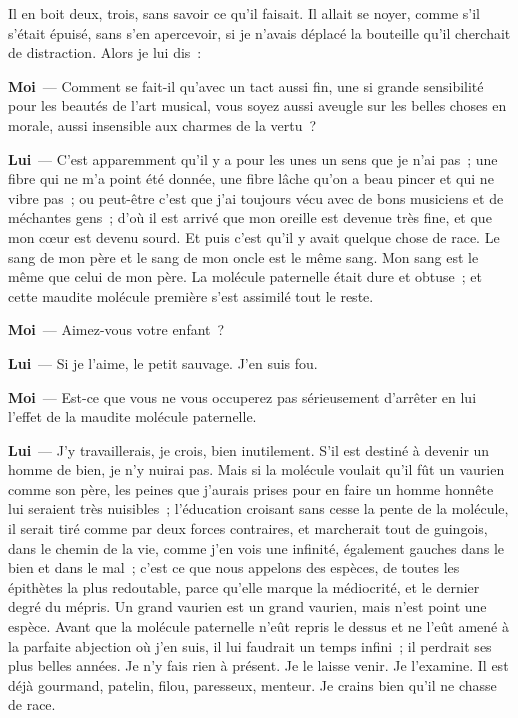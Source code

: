 \documentclass[french,twoside]{book} %
\newcommand{\labelchar}[1]{\textbf{\color{rubric} #1}}
\begin{document}
Il en boit deux, trois, sans savoir ce qu’il faisait. Il allait se noyer, comme s’il s’était épuisé, sans s’en apercevoir, si je n’avais déplacé la bouteille qu’il cherchait de distraction. Alors je lui dis :\par
\labelchar{Moi} — Comment se fait-il qu’avec un tact aussi fin, une si grande sensibilité pour les beautés de l’art musical, vous soyez aussi aveugle sur les belles choses en morale, aussi insensible aux charmes de la vertu ?\par
\labelchar{Lui} — C’est apparemment qu’il y a pour les unes un sens que je n’ai pas ; une fibre qui ne m’a point été donnée, une fibre lâche qu’on a beau pincer et qui ne vibre pas ; ou peut-être c’est que j’ai toujours vécu avec de bons musiciens et de méchantes gens ; d’où il est arrivé que mon oreille est devenue très fine, et que mon cœur est devenu sourd. Et puis c’est qu’il y avait quelque chose de race. Le sang de mon père et le sang de mon oncle est le même sang. Mon sang est le même que celui de mon père. La molécule paternelle était dure et obtuse ; et cette maudite molécule première s’est assimilé tout le reste.\par
\labelchar{Moi} — Aimez-vous votre enfant ?\par
\labelchar{Lui} — Si je l’aime, le petit sauvage. J’en suis fou.\par
\labelchar{Moi} — Est-ce que vous ne vous occuperez pas sérieusement d’arrêter en lui l’effet de la maudite molécule paternelle.\par
\labelchar{Lui} — J’y travaillerais, je crois, bien inutilement. S’il est destiné à devenir un homme de bien, je n’y nuirai pas. Mais si la molécule voulait qu’il fût un vaurien comme son père, les peines que j’aurais prises pour en faire un homme honnête lui seraient très nuisibles ; l’éducation croisant sans cesse la pente de la molécule, il serait tiré comme par deux forces contraires, et marcherait tout de guingois, dans le chemin de la vie, comme j’en vois une infinité, également gauches dans le bien et dans le mal ; c’est ce que nous appelons des espèces, de toutes les épithètes la plus redoutable, parce qu’elle marque la médiocrité, et le dernier degré du mépris. Un grand vaurien est un grand vaurien, mais n’est point une espèce. Avant que la molécule paternelle n’eût repris le dessus et ne l’eût amené à la parfaite abjection où j’en suis, il lui faudrait un temps infini ; il perdrait ses plus belles années. Je n’y fais rien à présent. Je le laisse venir. Je l’examine. Il est déjà gourmand, patelin, filou, paresseux, menteur. Je crains bien qu’il ne chasse de race.\par
\end{document}
